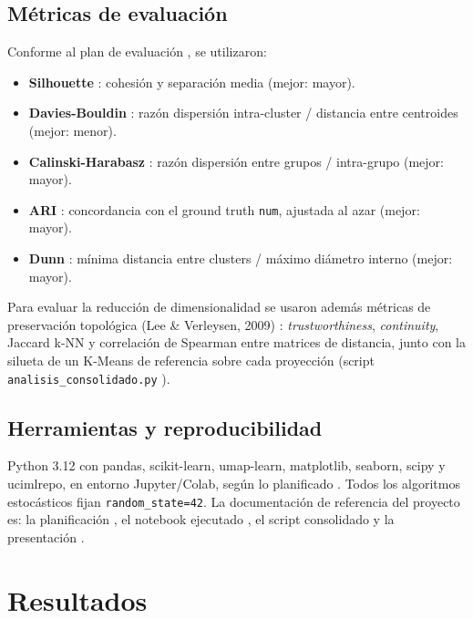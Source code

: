 \documentclass[11pt,a4paper]{article}
\begin{document}
\subsection{Métricas de evaluación}

Conforme al plan de evaluación \cite{planificacion}, se utilizaron:

\begin{itemize}
  \item \textbf{Silhouette} \cite{rousseeuw1987}: cohesión y separación media (mejor: mayor).
  \item \textbf{Davies-Bouldin} \cite{davies1979}: razón dispersión intra-cluster / distancia
        entre centroides (mejor: menor).
  \item \textbf{Calinski-Harabasz} \cite{calinski1974}: razón dispersión entre grupos /
        intra-grupo (mejor: mayor).
  \item \textbf{ARI} \cite{hubert1985}: concordancia con el ground truth \texttt{num},
        ajustada al azar (mejor: mayor).
  \item \textbf{Dunn} \cite{dunn1974}: mínima distancia entre clusters / máximo diámetro
        interno (mejor: mayor).
\end{itemize}

Para evaluar la reducción de dimensionalidad se usaron además métricas de preservación
topológica (Lee \& Verleysen, 2009) \cite{lee2009}: \emph{trustworthiness}, \emph{continuity},
Jaccard k-NN y correlación de Spearman entre matrices de distancia, junto con la silueta de un
K-Means de referencia sobre cada proyección (script \texttt{analisis\_consolidado.py}
\cite{script}).

\subsection{Herramientas y reproducibilidad}

Python 3.12 con pandas, scikit-learn, umap-learn, matplotlib, seaborn, scipy y ucimlrepo, en
entorno Jupyter/Colab, según lo planificado \cite{planificacion}. Todos los algoritmos
estocásticos fijan \texttt{random\_state=42}. La documentación de referencia del proyecto es:
la planificación \cite{planificacion}, el notebook ejecutado \cite{notebook}, el script
consolidado \cite{script} y la presentación \cite{presentacion}.

\section{Resultados}\label{sec:resultados}
\end{document}
